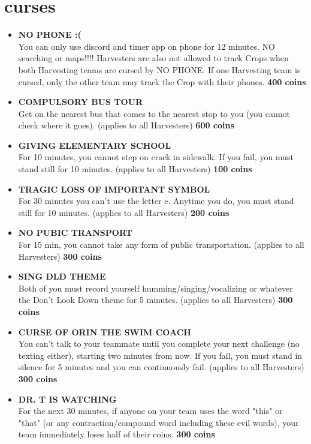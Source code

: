 \documentclass{article}
\begin{document}
\section{curses}
\begin{itemize}
    \setcounter{enumi}{-1}
    \item \textbf{NO PHONE :(} \\ You can only use discord and timer app on phone for 12 minutes. NO searching or maps!!!! Harvesters are also not allowed to track Crops when both Harvesting teams are cursed by NO PHONE. If one Harvesting team is cursed, only the other team may track the Crop with their phones. \textbf{400 coins }
    \item \textbf{COMPULSORY BUS TOUR} \\Get on the nearest bus that comes to the nearest stop to you (you cannot check where it goes). (applies to all Harvesters) \textbf{600 coins}
    \item \textbf{GIVING ELEMENTARY SCHOOL} \\ For 10 minutes, you cannot step on crack in sidewalk. If you fail, you must stand still for 10 minutes. (applies to all Harvesters) \textbf{100 coins}
    \item \textbf{TRAGIC LOSS OF IMPORTANT SYMBOL} \\ For 30 minutes you can't use the letter e. Anytime you do, you must stand still for 10 minutes. (applies to all Harvesters) \textbf{200 coins}
    \item \textbf{NO PUBIC TRANSPORT} \\ For 15 min, you cannot take any form of public transportation. (applies to all Harvesters) \textbf{300 coins}
    \item \textbf{SING DLD THEME} \\ Both of you must record yourself humming/singing/vocalizing or whatever the Don't Look Down theme for 5 minutes. (applies to all Harvesters) \textbf{300 coins}
    \item \textbf{CURSE OF ORIN THE SWIM COACH} \\ You can't talk to your teammate until you complete your next challenge (no texting either), starting two minutes from now. If you fail, you must stand in silence for 5 minutes and you can continuously fail. (applies to all Harvesters) \textbf{300 coins}
    \item \textbf{DR. T IS WATCHING} \\ For the next 30 minutes, if anyone on your team uses the word "this" or "that" (or any contraction/compound word including these evil words), your team immediately loses half of their coins. \textbf{300 coins}

\end{itemize}
\end{document}
